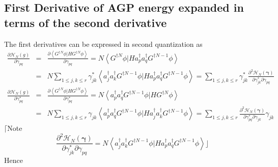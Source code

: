 \documentclass[aps,preprint]{revtex4}
\begin{document}
\subsection{First Derivative of AGP energy expanded in terms of the second
derivative}

The first derivatives can be expressed in second quantization as 
\begin{eqnarray}
\frac{\partial \mathcal{H}_{N}\left( g\right) }{\partial \gamma _{pq}} &=&%
\frac{\partial \left\langle G^{\dagger N}\phi |HG^{\dagger N}\phi
\right\rangle }{\partial \gamma _{pq}}=N\left\langle G^{\dagger N}\phi
|Ha_{p}^{\dagger }a_{q}^{\dagger }G^{\dagger N-1}\phi \right\rangle 
\nonumber \\
&=&N\sum_{1\leq j,k\leq r}\gamma _{jk}^{\ast }\left\langle a_{j}^{\dagger
}a_{k}^{\dagger }G^{\dagger N-1}\phi |Ha_{p}^{\dagger }a_{q}^{\dagger
}G^{\dagger N-1}\phi \right\rangle =\sum_{1\leq j,k\leq r}\gamma _{jk}^{\ast
}\frac{\partial ^{2}\mathcal{H}_{N}\left( \mathbf{\gamma }\right) }{\partial
\gamma _{jk}^{\ast }\partial \gamma _{pq}}  \nonumber \\
\frac{\partial \mathcal{H}_{N}\left( g\right) }{\partial \gamma _{pq}^{\ast }%
} &=&\frac{\partial \left\langle G^{\dagger N}\phi |HG^{\dagger N}\phi
\right\rangle }{\partial \gamma _{pq}^{\ast }}=N\left\langle a_{p}^{\dagger
}a_{q}^{\dagger }G^{\dagger N-1}\phi |HG^{\dagger N}\phi \right\rangle 
\nonumber \\
&=&N\sum_{1\leq j,k\leq r}\gamma _{jk}\left\langle a_{p}^{\dagger
}a_{q}^{\dagger }G^{\dagger N-1}\phi |Ha_{j}^{\dagger }a_{k}^{\dagger
}G^{\dagger N-1}\phi \right\rangle =\sum_{1\leq j,k\leq r}\frac{\partial ^{2}%
\mathcal{H}_{N}\left( \mathbf{\gamma }\right) }{\partial \gamma _{pq}^{\ast
}\partial \gamma _{jk}}\gamma _{jk}
\end{eqnarray}%
$\lceil $Note 
\begin{equation}
\frac{\partial ^{2}\mathcal{H}_{N}\left( \mathbf{\gamma }\right) }{\partial
\gamma _{jk}^{\ast }\partial \gamma _{pq}}=N\left\langle a_{j}^{\dagger
}a_{k}^{\dagger }G^{\dagger N-1}\phi |Ha_{p}^{\dagger }a_{q}^{\dagger
}G^{\dagger N-1}\phi \right\rangle \rfloor
\end{equation}%
Hence 
\end{document}
